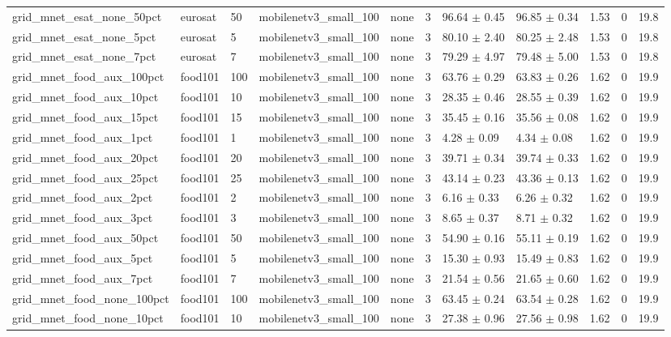\begin{tabular}{lllllllllll}
grid_mnet_esat_none_50pct & eurosat & 50 & mobilenetv3_small_100 & none & 3 & 96.64 $\pm$ 0.45 & 96.85 $\pm$ 0.34 & 1.53 & 0 & 19.8 \\
grid_mnet_esat_none_5pct & eurosat & 5 & mobilenetv3_small_100 & none & 3 & 80.10 $\pm$ 2.40 & 80.25 $\pm$ 2.48 & 1.53 & 0 & 19.8 \\
grid_mnet_esat_none_7pct & eurosat & 7 & mobilenetv3_small_100 & none & 3 & 79.29 $\pm$ 4.97 & 79.48 $\pm$ 5.00 & 1.53 & 0 & 19.8 \\
grid_mnet_food_aux_100pct & food101 & 100 & mobilenetv3_small_100 & none & 3 & 63.76 $\pm$ 0.29 & 63.83 $\pm$ 0.26 & 1.62 & 0 & 19.9 \\
grid_mnet_food_aux_10pct & food101 & 10 & mobilenetv3_small_100 & none & 3 & 28.35 $\pm$ 0.46 & 28.55 $\pm$ 0.39 & 1.62 & 0 & 19.9 \\
grid_mnet_food_aux_15pct & food101 & 15 & mobilenetv3_small_100 & none & 3 & 35.45 $\pm$ 0.16 & 35.56 $\pm$ 0.08 & 1.62 & 0 & 19.9 \\
grid_mnet_food_aux_1pct & food101 & 1 & mobilenetv3_small_100 & none & 3 & 4.28 $\pm$ 0.09 & 4.34 $\pm$ 0.08 & 1.62 & 0 & 19.9 \\
grid_mnet_food_aux_20pct & food101 & 20 & mobilenetv3_small_100 & none & 3 & 39.71 $\pm$ 0.34 & 39.74 $\pm$ 0.33 & 1.62 & 0 & 19.9 \\
grid_mnet_food_aux_25pct & food101 & 25 & mobilenetv3_small_100 & none & 3 & 43.14 $\pm$ 0.23 & 43.36 $\pm$ 0.13 & 1.62 & 0 & 19.9 \\
grid_mnet_food_aux_2pct & food101 & 2 & mobilenetv3_small_100 & none & 3 & 6.16 $\pm$ 0.33 & 6.26 $\pm$ 0.32 & 1.62 & 0 & 19.9 \\
grid_mnet_food_aux_3pct & food101 & 3 & mobilenetv3_small_100 & none & 3 & 8.65 $\pm$ 0.37 & 8.71 $\pm$ 0.32 & 1.62 & 0 & 19.9 \\
grid_mnet_food_aux_50pct & food101 & 50 & mobilenetv3_small_100 & none & 3 & 54.90 $\pm$ 0.16 & 55.11 $\pm$ 0.19 & 1.62 & 0 & 19.9 \\
grid_mnet_food_aux_5pct & food101 & 5 & mobilenetv3_small_100 & none & 3 & 15.30 $\pm$ 0.93 & 15.49 $\pm$ 0.83 & 1.62 & 0 & 19.9 \\
grid_mnet_food_aux_7pct & food101 & 7 & mobilenetv3_small_100 & none & 3 & 21.54 $\pm$ 0.56 & 21.65 $\pm$ 0.60 & 1.62 & 0 & 19.9 \\
grid_mnet_food_none_100pct & food101 & 100 & mobilenetv3_small_100 & none & 3 & 63.45 $\pm$ 0.24 & 63.54 $\pm$ 0.28 & 1.62 & 0 & 19.9 \\
grid_mnet_food_none_10pct & food101 & 10 & mobilenetv3_small_100 & none & 3 & 27.38 $\pm$ 0.96 & 27.56 $\pm$ 0.98 & 1.62 & 0 & 19.9 \\

\end{tabular}
